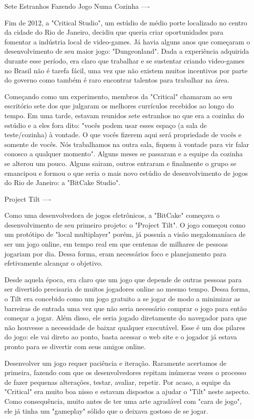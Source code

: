 Sete Estranhos Fazendo Jogo Numa Cozinha
----

Fim de 2012, a "Critical Studio", um estúdio de médio porte localizado no centro da cidade do Rio de Janeiro, decidiu que queria criar oportunidades para fomentar a indústria local de video-games. Já havia alguns anos que começaram o desenvolvimento de seu maior jogo: "Dungeonland". Dada a experiência adquirida durante esse período, era claro que trabalhar e se sustentar criando video-games no Brasil não é tarefa fácil, uma vez que não existem muitos incentivos por parte do governo como também é raro encontrar talentos para trabalhar na área.

Começando como um experimento, membros da "Critical" chamaram ao seu escritório sete dos que julgaram os melhores currículos recebidos ao longo do tempo. Em uma tarde, estavam reunidos sete estranhos no que era a cozinha do estúdio e a eles fora dito: "vocês podem usar esses espaço (a sala de teste/cozinha) à vontade. O que vocês fizerem aqui será propriedade de vocês e somente de vocês. Nós trabalhamos na outra sala, fiquem à vontade para vir falar conosco a qualquer momento". Alguns meses se passaram e a equipe da cozinha se alterou um pouco. Alguns sairam, outros entraram e finalmente o grupo se emancipou e formou o que seria o mais novo estúdio de desenvolvimento de jogos do Rio de Janeiro: a "BitCake Studio".


Project Tilt
----

Como uma desenvolvedora de jogos eletrônicos, a "BitCake" começava o desenvolvimento de seu primeiro projeto: o "Project Tilt". O jogo começou como um protótipo de "local multiplayer" porém, já possuía a visão megalomaníaca de ser um jogo online, em tempo real em que centenas de milhares de pessoas jogariam por dia. Dessa forma, eram necessários foco e planejamento para efetivamente alcançar o objetivo.

Desde aquela época, era claro que um jogo que depende de outras pessoas para ser divertido precisaria de muitos jogadores online ao mesmo tempo. Dessa forma, o Tilt era concebido como um jogo gratuito a se jogar de modo a minimizar as barreiras de entrada uma vez que não seria necessário comprar o jogo para então começar a jogar. Além disso, ele seria jogado diretamente do navegador para que não houvesse a necessidade de baixar qualquer executável. Esse é um dos pilares do jogo: ele vai direto ao ponto, basta acessar o web site e o jogador já estava pronto para se divertir com seus amigos online.

Desenvolver um jogo requer paciência e iteração. Raramente acertamos de primeira, fazendo com que os desenvolvedores repitam inúmeras vezes o processo de fazer pequenas alterações, testar, avaliar, repetir. Por acaso, a equipe da "Critical" era muito boa nisso e estavam dispostos a ajudar o "Tilt" neste aspecto. Como consequência, muito antes de ter uma arte agradável com "cara de jogo", ele já tinha um "gameplay" sólido que o deixava gostoso de se jogar.

